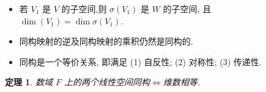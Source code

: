 \documentclass[13pt]{beamer}
\newtheorem{thm}{定理}
\newtheorem{exa}{例}
\def\dim{\operatorname{dim}}
\begin{document}
\begin{frame}
\begin{itemize}

\item 若 $V_{1}$ 是 $V$ 的子空间,则 $\sigma \left(V_{1}\right)$ 是 $W$ 的子空间, 且 $\dim (V_1) =\dim \sigma \left(V_{1}\right)$.

\item 同构映射的逆及同构映射的乘积仍然是同构的.

\item  同构是一个等价关系, 即满足
        (1) 自反性; 
        (2) 对称性; 
        (3) 传递性. 
\end{itemize}
\begin{thm}
数域 $F$ 上的两个线性空间同构$\Leftrightarrow$维数相等.
\end{thm}
\end{frame}
%
%
%
%
\end{document}
